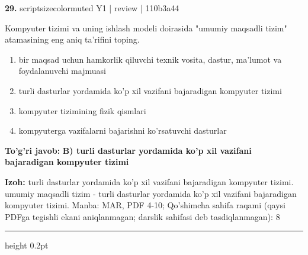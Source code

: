 \documentclass[10pt,a4paper]{article}
\begin{document}
{\bfseries\sffamily\color{ink} 29.} {scriptsizecolor{muted} Y1 | review | 110b3a44}
\par
Kompyuter tizimi va uning ishlash modeli doirasida "umumiy maqsadli tizim" atamasining eng aniq ta'rifini toping.
\begin{enumerate}[label=\Alph*),leftmargin=9mm]
\item bir maqsad uchun hamkorlik qiluvchi texnik vosita, dastur, ma'lumot va foydalanuvchi majmuasi
\item turli dasturlar yordamida ko'p xil vazifani bajaradigan kompyuter tizimi
\item kompyuter tizimining fizik qismlari
\item kompyuterga vazifalarni bajarishni ko'rsatuvchi dasturlar
\end{enumerate}
\begin{tcolorbox}[enhanced,breakable,colback=teal!4,colframe=teal!60!black,boxrule=0.45pt,arc=1.2mm,left=2.7mm,right=2.7mm,top=1.8mm,bottom=1.8mm,before skip=2mm,after skip=2mm]
{\bfseries\sffamily\color{teal}To'g'ri javob:} \textbf{B) turli dasturlar yordamida ko'p xil vazifani bajaradigan kompyuter tizimi}
\par\smallskip
{\bfseries Izoh:} turli dasturlar yordamida ko'p xil vazifani bajaradigan kompyuter tizimi. umumiy maqsadli tizim - turli dasturlar yordamida ko'p xil vazifani bajaradigan kompyuter tizimi. Manba: MAR, PDF 4-10; Qo'shimcha sahifa raqami (qaysi PDFga tegishli ekani aniqlanmagan; darslik sahifasi deb tasdiqlanmagan): 8
\end{tcolorbox}
\vspace{2mm}\hrule height 0.2pt\vspace{3mm}
\end{document}
